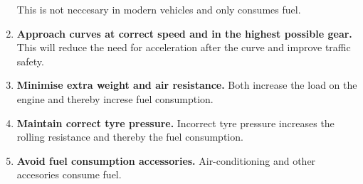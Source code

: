 \begin{enumerate}
This is not neccesary in modern vehicles and only consumes fuel.
\item \label{advice.curves}\textbf{Approach curves at correct speed and in the highest possible gear.}
This will reduce the need for acceleration after the curve and improve traffic safety.
\item \label{advice.weightAir}\textbf{Minimise extra weight and air resistance.} 
Both increase the load on the engine and thereby increse fuel consumption.
\item \label{advice.tyre}\textbf{Maintain correct tyre pressure.}
Incorrect tyre pressure increases the rolling resistance and thereby the fuel consumption.
\item \label{advice.accessories}\textbf{Avoid fuel consumption accessories.}
Air-conditioning and other accesories consume fuel.
\end{enumerate}


